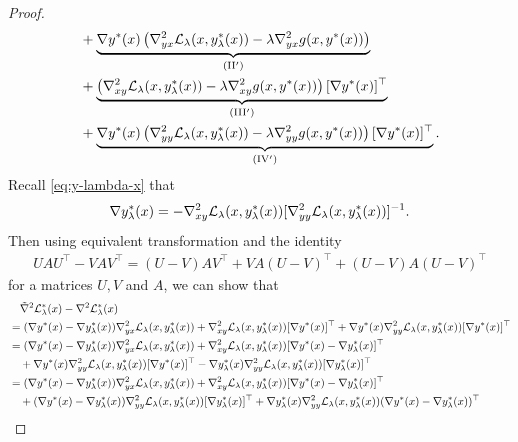 \begin{proof}
\begin{align*}
    &+  \underbrace{\nabla y^*(x) \left(\nabla_{yx}^2 {\mathcal{L}}_{\lambda}(x,y_{\lambda}^*(x))- \lambda \nabla_{yx}^2 g(x,y^*(x))\right) }_{\rm (II')}\\ 
    & + \underbrace{ \left(\nabla_{xy}^2 {\mathcal{L}}_{\lambda}(x,y_{\lambda}^*(x))- \lambda \nabla_{xy}^2 g(x,y^*(x))\right)[\nabla y^*(x)]^\top }_{\rm (III')} \\
    &+ \underbrace{\nabla y^*(x) \left(\nabla_{yy}^2 {\mathcal{L}}_{\lambda} (x,y_{\lambda}^*(x))   - \lambda \nabla_{yy}^2 g(x,y^*(x)) \right) [\nabla y^*(x)]^\top }_{\rm (IV')}. 
\end{align*}
Recall \eqref{eq:y-lambda-x} that
\begin{align*}
    \nabla y_{\lambda}^*(x) = - \nabla_{xy}^2 {\mathcal{L}}_{\lambda}(x,y_{\lambda}^*(x)) [\nabla_{yy}^2 {\mathcal{L}}_{\lambda}(x,y_{\lambda}^*(x)) ]^{-1}.
\end{align*}
Then using
equivalent transformation and the identity
\begin{align*}
    U A U^\top - V A V^\top = (U-V) A V^\top + VA (U-V)^\top + (U-V)A (U-V)^\top
\end{align*}
for a matrices $U,V$ and $A$,
we can show that
\begin{align*}
    &\quad \tilde \nabla^2 \fL_{\lambda}^*(x) - \nabla^2 \fL_{\lambda}^*(x) \\
    &= ( \nabla y^*(x) - \nabla y_{\lambda}^*(x) ) \nabla_{yx}^2 \fL_{\lambda} (x,y_{\lambda}^*(x)) + \nabla_{xy}^2 \fL_{\lambda}(x,y_{\lambda}^*(x)) [ \nabla y^*(x)]^\top + \nabla y^*(x) \nabla_{yy}^2 \fL_{\lambda} (x,y_{\lambda}^*(x)) [\nabla y^*(x)]^\top \\
    &= ( \nabla y^*(x) - \nabla y_{\lambda}^*(x) ) \nabla_{yx}^2 \fL_{\lambda} (x,y_{\lambda}^*(x)) + \nabla_{xy}^2 \fL_{\lambda}(x,y_{\lambda}^*(x)) [ \nabla y^*(x) - \nabla y_{\lambda}^*(x)]^\top \\
    &\quad + \nabla y^*(x) \nabla_{yy}^2 \fL_{\lambda} (x,y_{\lambda}^*(x)) [\nabla y^*(x)]^\top - \nabla y_{\lambda}^*(x) \nabla_{yy}^2 \fL_{\lambda} (x,y_{\lambda}^*(x)) [\nabla y_{\lambda}^*(x)]^\top \\
    &= ( \nabla y^*(x) - \nabla y_{\lambda}^*(x) ) \nabla_{yx}^2 \fL_{\lambda} (x,y_{\lambda}^*(x)) + \nabla_{xy}^2 \fL_{\lambda}(x,y_{\lambda}^*(x)) [ \nabla y^*(x) - \nabla y_{\lambda}^*(x)]^\top \\ 
    &\quad + (\nabla y^*(x) - \nabla y_{\lambda}^*(x)) \nabla_{yy}^2 \fL_{\lambda} (x,y_{\lambda}^*(x)) [ \nabla y_{\lambda}^*(x)]^\top + \nabla y_{\lambda}^*(x) \nabla_{yy}^2 \fL_{\lambda} (x,y_{\lambda}^*(x)) (\nabla y^*(x) - \nabla y_{\lambda}^*(x))^\top \\

\end{align*}
\end{proof}
